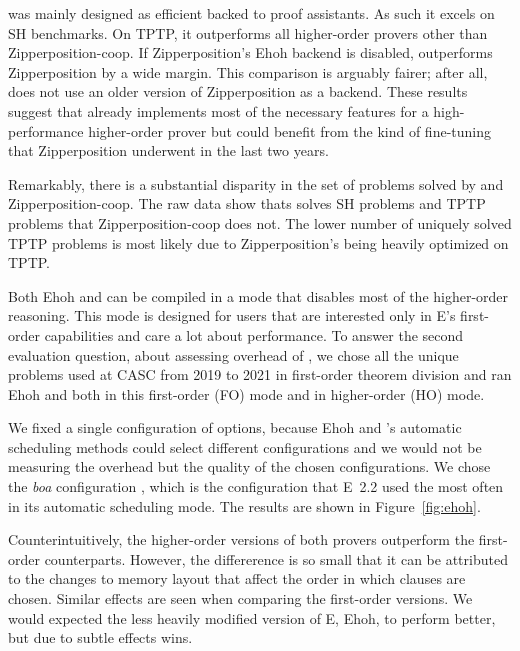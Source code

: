 \ehohii{} was mainly designed as efficient backed to proof assistants. As such it 
excels on SH benchmarks. On TPTP, it outperforms all higher-order provers other than Zipperposition-coop.
If Zipperposition's Ehoh backend is disabled,
\ehohii{} outperforms Zipperposition by a wide margin.
This comparison is arguably fairer; after all,
\ehohii{} does not use an older version of Zipperposition
as a backend.
%
These results suggest that \ehohii{} already implements most of the necessary features
for a high-performance higher-order prover
but could benefit from the kind of fine-tuning that
Zipperposition underwent in the last two years.

Remarkably, there is a substantial disparity in the set of problems solved by
\ehohii{} and Zipperposition-coop. The raw data show thats \ehohii{} solves
 SH problems and  TPTP problems that Zipperposition-coop
does not. The lower number of uniquely solved TPTP problems is most likely 
due to Zipperposition's being heavily optimized on TPTP.

 Both Ehoh and \ehohii{} can be compiled
in a mode that disables most of the higher-order reasoning. This mode is
designed for users that are interested only in E's first-order capabilities and
care a lot about performance.
To answer the second
evaluation question, about assessing overhead of \ehohii{},
we chose all the  unique problems used at CASC
from 2019 to 2021 in first-order theorem division and ran Ehoh and \ehohii{}
both in this first-order (FO) mode and in higher-order (HO) mode.

We fixed a single
configuration of options, because Ehoh and \ehohii{}'s
automatic scheduling methods could select different configurations
and we would not be measuring the overhead but the quality of the chosen
configurations. We chose the \emph{boa} configuration
\cite[Sect.~7]{section-ehoh},
which is the configuration that E~2.2 used the most often in its automatic scheduling mode.
The results are shown in Figure~\ref{fig:ehoh}.

Counterintuitively, the higher-order versions of both provers outperform
the first-order counterparts. However, the differerence is so small that it can
be attributed to the changes to memory layout that affect the order in which
clauses are chosen. Similar effects are seen when comparing the first-order versions.
We would expected the less heavily modified version of E, Ehoh, to perform better,
but due to subtle effects \ehohii{} wins.


